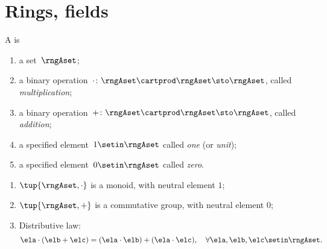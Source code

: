 
\section{Rings, fields}
\label{sec:rings-fields}




\begin{ctdefinition}[Ring]
    \label{def:ring}
    A  is
    \begin{body}
        \constit
        \begin{enumerate}
            \item a set~$\rngAset$;
            \item a binary operation~$\cdot \colon \rngAset \cartprod \rngAset \sto \rngAset$, called \emph{multiplication};
            \item a binary operation~$+ \colon \rngAset \cartprod \rngAset \sto \rngAset$, called \emph{addition};
            \item a specified element~$1 \setin \rngAset$ called \emph{one} (or \emph{unit});
            \item a specified element~$0 \setin \rngAset$ called \emph{zero}.
        \end{enumerate}
        \condit
        \begin{enumerate}
            \item $\tup{\rngAset, \cdot}$ is a monoid, with neutral element $1$;
            \item $\tup{\rngAset, +}$ is a commutative group, with neutral element $0$;
            \item Distributive law:
                  \begin{equation}\label{eq:distributive-law-rings}
                      \ela \cdot (\elb + \elc) = (\ela \cdot \elb) + (\ela \cdot \elc), \quad \forall \ela, \elb, \elc \setin \rngAset.
                  \end{equation}
        \end{enumerate}
    \end{body}
\end{ctdefinition}






